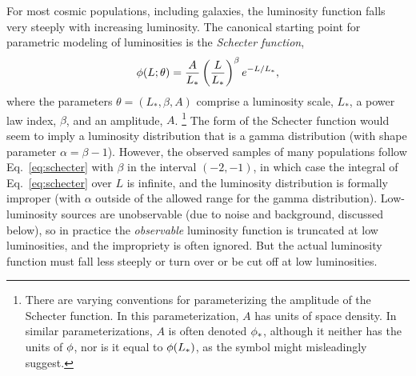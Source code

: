 For most cosmic populations, including galaxies, the luminosity function falls very steeply with increasing luminosity.
The canonical starting point for parametric modeling of luminosities is the \emph{Schecter function},
\[
\phi(L;\theta) =
  \frac{A}{L_*} \left(\frac{L}{L_*}\right)^{\beta} e^{-L/L_*},
\label{eq:schecter}
\]
where the parameters $\theta = (L_*,\beta, A)$ comprise a luminosity scale, $L_*$, a power law index, $\beta$, and an amplitude, $A$.%
\footnote{There are varying conventions for parameterizing the amplitude of the Schecter function.
In this parameterization, $A$ has units of space density.
In similar parameterizations, $A$ is often denoted $\phi_*$, although it neither has the units of $\phi$, nor is it equal to $\phi(L_*)$, as the symbol might misleadingly suggest.}
The form of the Schecter function would seem to imply a luminosity distribution that is a gamma distribution (with shape parameter $\alpha = \beta - 1$).
However, the observed samples of many populations follow Eq.~\ref{eq:schecter} with $\beta$ in the interval $(-2,-1)$, in which case the integral of Eq.~\ref{eq:schecter} over $L$ is infinite, and the luminosity distribution is formally improper (with $\alpha$ outside of the allowed range for the gamma distribution).
Low-luminosity sources are unobservable (due to noise and background, discussed below), so in practice the \emph{observable} luminosity function is truncated at low luminosities, and the impropriety is often ignored.
But the actual luminosity function must fall less steeply or turn over or be cut off at low luminosities.


